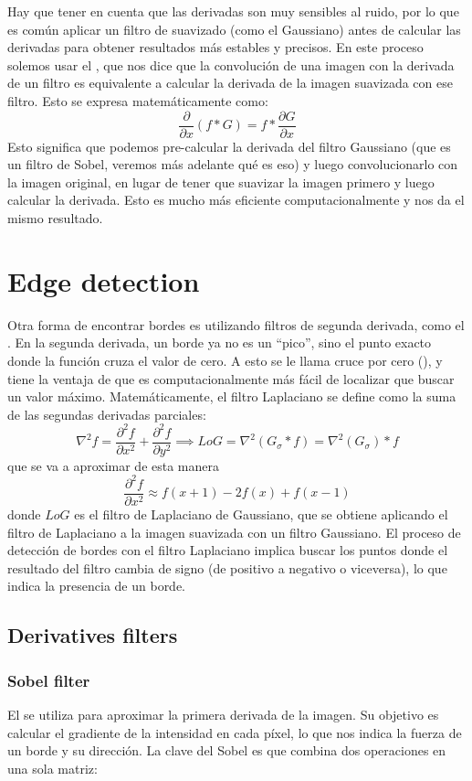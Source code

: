 \noindent
Hay que tener en cuenta que las derivadas son muy sensibles al ruido, por lo que es común aplicar un filtro de suavizado (como el Gaussiano) antes de calcular las derivadas para obtener resultados más estables y precisos. En este proceso solemos usar el , que nos dice que la convolución de una imagen con la derivada de un filtro es equivalente a calcular la derivada de la imagen suavizada con ese filtro. Esto se expresa matemáticamente como:
$$\frac{\partial}{\partial x}(f * G) = f * \frac{\partial G}{\partial x}$$
Esto significa que podemos pre-calcular la derivada del filtro Gaussiano (que es un filtro de Sobel, veremos más adelante qué es eso) y luego convolucionarlo con la imagen original, en lugar de tener que suavizar la imagen primero y luego calcular la derivada. Esto es mucho más eficiente computacionalmente y nos da el mismo resultado.

\section{Edge detection}
\noindent
Otra forma de encontrar bordes es utilizando filtros de segunda derivada, como el . En la segunda derivada, un borde ya no es un ``pico'', sino el punto exacto donde la función cruza el valor de cero. A esto se le llama cruce por cero (), y tiene la ventaja de que es computacionalmente más fácil de localizar que buscar un valor máximo. Matemáticamente, el filtro Laplaciano se define como la suma de las segundas derivadas parciales:
$$\nabla^2 f = \frac{\partial^2 f}{\partial x^2} + \frac{\partial^2 f}{\partial y^2}\implies LoG=\nabla^2 (G_\sigma \ast f)=\nabla^2(G_\sigma)\ast f$$
que se va a aproximar de esta manera
$$\frac{\partial^2 f}{\partial x^2} \approx f(x+1) - 2f(x) + f(x-1)$$
donde $LoG$ es el filtro de Laplaciano de Gaussiano, que se obtiene aplicando el filtro de Laplaciano a la imagen suavizada con un filtro Gaussiano. El proceso de detección de bordes con el filtro Laplaciano implica buscar los puntos donde el resultado del filtro cambia de signo (de positivo a negativo o viceversa), lo que indica la presencia de un borde.

\subsection{Derivatives filters}
\subsubsection{Sobel filter}
\noindent
El  se utiliza para aproximar la primera derivada de la imagen. Su objetivo es calcular el gradiente de la intensidad en cada píxel, lo que nos indica la fuerza de un borde y su dirección. La clave del Sobel es que combina dos operaciones en una sola matriz:

